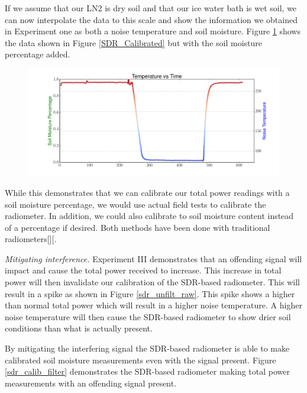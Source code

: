 {If we assume that our LN2 is dry soil and that our ice water bath is wet soil, we can now interpolate the data to this scale and show the information we obtained in Experiment one as both a noise temperature and soil moisture.  Figure \ref{SDR_soil} shows the data shown in Figure \ref{SDR_Calibrated} but with the soil moisture percentage added. 

\begin{figure}[h!tb] \centering

\includegraphics[width=\textwidth]{Experiments/Exp1/sdr_soilmoisture.pdf}
\label{SDR_soil}
\end{figure}

While this demonstrates that we can calibrate our total power readings with a soil moisture percentage, we would use actual field tests to calibrate the radiometer.  In addition, we could also calibrate to soil moisture content instead of a percentage if desired.  Both methods have been done with traditional radiometers[\cite{Jonard}][\cite{Shi}.

\emph{Mitigating interference.} Experiment III demonstrates that an offending signal will impact and cause the total power received to increase.   This increase in total power will then invalidate our calibration of the SDR-based radiometer.  This will result in a spike as shown in Figure \ref{sdr_unfilt_raw}.  This spike shows a higher than normal total power which will result in a higher noise temperature.  A higher noise temperature will then cause the SDR-based radiometer to show drier soil conditions than what is actually present.

By mitigating the interfering signal the SDR-based radiometer is able to make calibrated soil moisture measurements even with the signal present.  Figure \ref{sdr_calib_filter} demonstrates the SDR-based radiometer making total power measurements with an offending signal present.  

}
